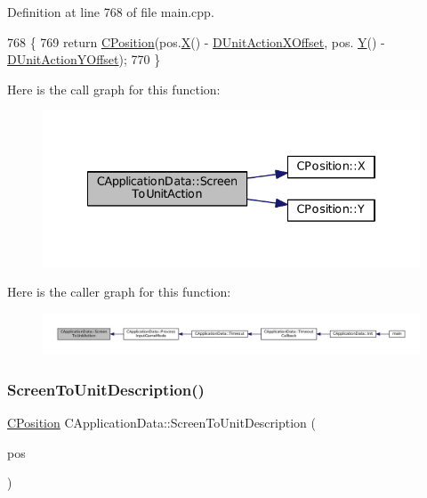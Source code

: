Definition at line 768 of file main.\+cpp.


\begin{DoxyCode}
768                                                                   \{
769     \textcolor{keywordflow}{return} \hyperlink{classCPosition}{CPosition}(pos.\hyperlink{classCPosition_a9a6b94d3b91df1492d166d9964c865fc}{X}() - \hyperlink{classCApplicationData_aa47b53d283617575a4866c08d83e27c4}{DUnitActionXOffset}, pos.
      \hyperlink{classCPosition_a1aa8a30e2f08dda1f797736ba8c13a87}{Y}() - \hyperlink{classCApplicationData_a8ccfb55bd25cba0e6eb66573ba9c8b3c}{DUnitActionYOffset});
770 \}
\end{DoxyCode}
Here is the call graph for this function\+:
\nopagebreak
\begin{figure}[H]
\begin{center}
\leavevmode
\includegraphics[width=334pt]{classCApplicationData_a2d956280cfd6074f56db3753c7467248_cgraph}
\end{center}
\end{figure}
Here is the caller graph for this function\+:
\nopagebreak
\begin{figure}[H]
\begin{center}
\leavevmode
\includegraphics[width=350pt]{classCApplicationData_a2d956280cfd6074f56db3753c7467248_icgraph}
\end{center}
\end{figure}
\hypertarget{classCApplicationData_a5400b710281ac2671d8d76aa442124ec}{}\label{classCApplicationData_a5400b710281ac2671d8d76aa442124ec} 
\subsubsection{\texorpdfstring{Screen\+To\+Unit\+Description()}{ScreenToUnitDescription()}}
{\footnotesize\ttfamily \hyperlink{classCPosition}{C\+Position} C\+Application\+Data\+::\+Screen\+To\+Unit\+Description (\begin{DoxyParamCaption}\item[{const \hyperlink{classCPosition}{C\+Position} \&}]{pos }\end{DoxyParamCaption})\hspace{0.3cm}{\ttfamily [protected]}}




